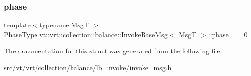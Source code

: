 \mbox{\label{structvt_1_1vrt_1_1collection_1_1balance_1_1_invoke_base_msg_a54932333596506829f5a5f422cb585f5}} 
\subsubsection{\texorpdfstring{phase\+\_\+}{phase\_}}
{\footnotesize\ttfamily template$<$typename MsgT $>$ \\
\hyperlink{namespacevt_a46ce6733d5cdbd735d561b7b4029f6d7}{Phase\+Type} \hyperlink{structvt_1_1vrt_1_1collection_1_1balance_1_1_invoke_base_msg}{vt\+::vrt\+::collection\+::balance\+::\+Invoke\+Base\+Msg}$<$ MsgT $>$\+::phase\+\_\+ = 0}



The documentation for this struct was generated from the following file\+:\begin{DoxyCompactItemize}
\item 
src/vt/vrt/collection/balance/lb\+\_\+invoke/\hyperlink{invoke__msg_8h}{invoke\+\_\+msg.\+h}\end{DoxyCompactItemize}
